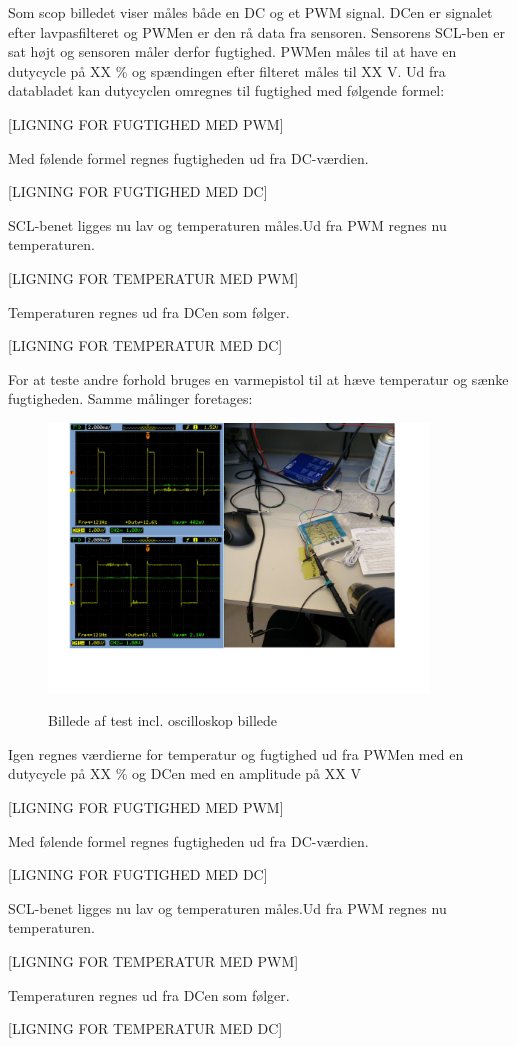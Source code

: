 Som scop billedet viser måles både en DC og et PWM signal. DCen er signalet efter lavpasfilteret og PWMen er den rå data fra sensoren. 
Sensorens SCL-ben er sat højt og sensoren måler derfor fugtighed. PWMen måles til at have en dutycycle på XX \% og spændingen efter filteret måles til XX V. Ud fra databladet kan dutycyclen omregnes til fugtighed med følgende formel:

[LIGNING FOR FUGTIGHED MED PWM]

Med følende formel regnes fugtigheden ud fra DC-værdien.

[LIGNING FOR FUGTIGHED MED DC]

SCL-benet ligges nu lav og temperaturen måles.Ud fra PWM regnes nu temperaturen.

[LIGNING FOR TEMPERATUR MED PWM]

Temperaturen regnes ud fra DCen som følger. 

[LIGNING FOR TEMPERATUR MED DC]


For at teste andre forhold bruges en varmepistol til at hæve temperatur og sænke fugtigheden. 
Samme målinger foretages:

\begin{figure}[h]
\centering
{\includegraphics[width=0.90\textwidth]{filer/modultest/Billeder/test_varmt}}
\caption{Billede af test incl. oscilloskop billede}
\label{lab:test_varmt}
\end{figure}

Igen regnes værdierne for temperatur og fugtighed ud fra PWMen med en dutycycle på XX \% og DCen med en amplitude på XX V


[LIGNING FOR FUGTIGHED MED PWM]

Med følende formel regnes fugtigheden ud fra DC-værdien.

[LIGNING FOR FUGTIGHED MED DC]

SCL-benet ligges nu lav og temperaturen måles.Ud fra PWM regnes nu temperaturen.

[LIGNING FOR TEMPERATUR MED PWM]

Temperaturen regnes ud fra DCen som følger. 

[LIGNING FOR TEMPERATUR MED DC]

